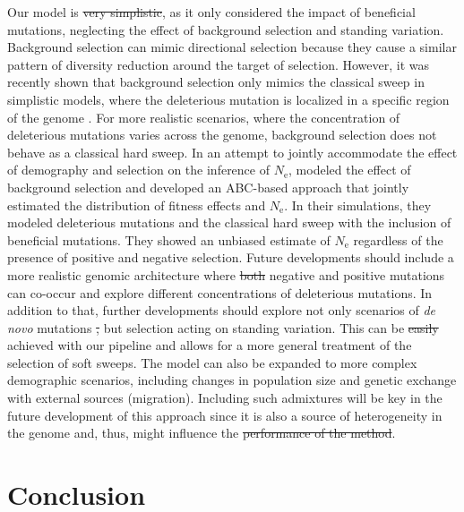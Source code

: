 \documentclass[a4paper, 12pt]{article}
\providecommand{\DIFaddtex}[1]{{\protect\color{blue}\uwave{#1}}} %
\providecommand{\DIFdeltex}[1]{{\protect\color{red}\sout{#1}}}                      %
\providecommand{\DIFaddbegin}{} %
\providecommand{\DIFaddend}{} %
\providecommand{\DIFdelbegin}{} %
\providecommand{\DIFdelend}{} %
\providecommand{\DIFadd}[1]{\texorpdfstring{\DIFaddtex{#1}}{#1}} %
\providecommand{\DIFdel}[1]{\texorpdfstring{\DIFdeltex{#1}}{}} %
\newcommand{\DIFscaledelfig}{0.5}
\newlength{\DIFdelgraphicswidth} %
\newlength{\DIFdelgraphicsheight} %
\newcommand{\DIFaddincludegraphics}[2][]{{\color{blue}\fbox{\DIFOincludegraphics[#1]{#2}}}} %
\newcommand{\DIFdelincludegraphics}[2][]{%
\sbox{\DIFdelgraphicsbox}{\DIFOincludegraphics[#1]{#2}}%
\settoboxwidth{\DIFdelgraphicswidth}{\DIFdelgraphicsbox} %
\settoboxtotalheight{\DIFdelgraphicsheight}{\DIFdelgraphicsbox} %
\scalebox{\DIFscaledelfig}{%
\parbox[b]{\DIFdelgraphicswidth}{\usebox{\DIFdelgraphicsbox}\\[-\baselineskip] \rule{\DIFdelgraphicswidth}{0em}}\llap{\resizebox{\DIFdelgraphicswidth}{\DIFdelgraphicsheight}{%
\setlength{\unitlength}{\DIFdelgraphicswidth}%
\begin{picture}(1,1)%
\thicklines\linethickness{2pt} %
{\color[rgb]{1,0,0}\put(0,0){\framebox(1,1){}}}%
{\color[rgb]{1,0,0}\put(0,0){\line( 1,1){1}}}%
{\color[rgb]{1,0,0}\put(0,1){\line(1,-1){1}}}%
\end{picture}%
}\hspace*{3pt}}} %
} %
\DeclareRobustCommand{\DIFaddbegin}{\DIFOaddbegin \let\includegraphics\DIFaddincludegraphics} %
\DeclareRobustCommand{\DIFaddend}{\DIFOaddend \let\includegraphics\DIFOincludegraphics} %
\DeclareRobustCommand{\DIFdelbegin}{\DIFOdelbegin \let\includegraphics\DIFdelincludegraphics} %
\DeclareRobustCommand{\DIFdelend}{\DIFOaddend \let\includegraphics\DIFOincludegraphics} %
\begin{document}
Our model is \DIFdelbegin \DIFdel{very simplistic}\DIFdelend \DIFaddbegin \DIFadd{relatively simple}\DIFaddend , as it only considered the impact of beneficial mutations, neglecting the effect of background selection and standing variation. Background selection can mimic directional selection because they cause a similar pattern of diversity reduction around the target of selection. However, it was recently shown that background selection only mimics the classical sweep in simplistic models, where the deleterious mutation is localized in a specific region of the genome \citep{Schrider:2020hka}. For more realistic scenarios, where the concentration of deleterious mutations varies across the genome, background selection does not behave as a classical hard sweep. In an attempt to jointly accommodate the effect of demography and selection on the inference of $N_{\mathrm{e}}$,  \citet{Johri:2020ee} modeled the effect of background selection and developed an ABC-based approach that jointly estimated the distribution of fitness effects and $N_{\mathrm{e}}$. In their simulations, they modeled deleterious mutations and the classical hard sweep with the inclusion of beneficial mutations. They showed an unbiased estimate of $N_{\mathrm{e}}$ regardless of the presence of positive and negative selection. Future developments should include a more realistic genomic architecture where \DIFdelbegin \DIFdel{both }\DIFdelend negative and positive mutations can co-occur and explore different concentrations of deleterious mutations. In addition to that, further developments should explore not only scenarios of \textit{de novo} mutations \DIFdelbegin \DIFdel{, }\DIFdelend but selection acting on standing variation. This can be \DIFdelbegin \DIFdel{easily }\DIFdelend achieved with our pipeline and allows for a more general treatment of the selection of soft sweeps. The model can also be expanded to more complex demographic scenarios, including changes in population size and genetic exchange with external sources (migration). Including such admixtures will be key in the future development of this approach since it is also a source of heterogeneity in the genome and, thus, might influence the \DIFdelbegin \DIFdel{performance of the method}\DIFdelend \DIFaddbegin \DIFadd{method's performance}\DIFaddend . 

\section*{Conclusion}
\end{document}
